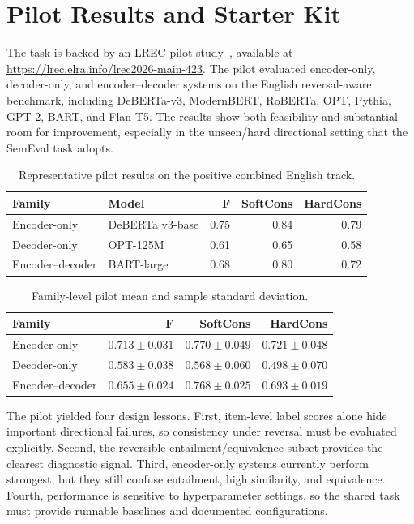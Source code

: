 \documentclass[11pt]{article}
\begin{document}
\section{Pilot Results and Starter Kit}

The task is backed by an LREC pilot study~\cite{apaolaza-etal-2026-assessing}, available at \url{https://lrec.elra.info/lrec2026-main-423}.
The pilot evaluated encoder-only, decoder-only, and encoder--decoder systems on the English reversal-aware benchmark, including DeBERTa-v3, ModernBERT, RoBERTa, OPT, Pythia, GPT-2, BART, and Flan-T5.
The results show both feasibility and substantial room for improvement, especially in the unseen/hard directional setting that the SemEval task adopts.

\begin{table}[h]
\centering
\small
\begin{tabular}{llrrr}
\toprule
Family & Model & F & SoftCons & HardCons \\
\midrule
Encoder-only & DeBERTa v3-base & 0.75 & 0.84 & 0.79 \\
Decoder-only & OPT-125M & 0.61 & 0.65 & 0.58 \\
Encoder--decoder & BART-large & 0.68 & 0.80 & 0.72 \\
\bottomrule
\end{tabular}
\caption{Representative pilot results on the positive combined English track.}
\label{tab:pilot-representative}
\end{table}

\begin{table}[h]
\centering
\small
\begin{tabular}{lrrr}
\toprule
Family & F & SoftCons & HardCons \\
\midrule
Encoder-only & \(0.713 \pm 0.031\) & \(0.770 \pm 0.049\) & \(0.721 \pm 0.048\) \\
Decoder-only & \(0.583 \pm 0.038\) & \(0.568 \pm 0.060\) & \(0.498 \pm 0.070\) \\
Encoder--decoder & \(0.655 \pm 0.024\) & \(0.768 \pm 0.025\) & \(0.693 \pm 0.019\) \\
\bottomrule
\end{tabular}
\caption{Family-level pilot mean and sample standard deviation.}
\label{tab:pilot-family}
\end{table}

The pilot yielded four design lessons.
First, item-level label scores alone hide important directional failures, so consistency under reversal must be evaluated explicitly.
Second, the reversible entailment/equivalence subset provides the clearest diagnostic signal.
Third, encoder-only systems currently perform strongest, but they still confuse entailment, high similarity, and equivalence.
Fourth, performance is sensitive to hyperparameter settings, so the shared task must provide runnable baselines and documented configurations.
\end{document}
